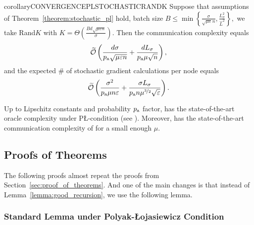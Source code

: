 \documentclass{article}
\newcommand{\alexander}[1]{\todo[inline]{\textbf{Alexander: }#1}}
\newcommand{\algorithmname}{DARIA}
\newcommand*{\probavailable}{\ensuremath{p_{\textnormal{a}}}}
\begin{document}
\begin{restatable}{corollary}{CONVERGENCEPLSTOCHASTICRANDK}
  Suppose that assumptions of Theorem~\ref{theorem:stochastic_pl} hold, 
  batch size $B \leq \min\left\{\frac{\sigma}{\sqrt{\mu \varepsilon} n}, \frac{L_{\sigma}^2}{\widehat{L}^2}\right\},$ 
  we take Rand$K$ with $K = \Theta\left(\frac{B d \sqrt{\mu \varepsilon n}}{\sigma}\right).$ Then
  the communication complexity equals 
  \begin{align*}
    \widetilde{\cO}\left(\frac{d \sigma}{\probavailable \sqrt{\mu \varepsilon n}} + \frac{d L_{\sigma}}{\probavailable \mu \sqrt{n}}\right),
  \end{align*}
  and the expected \# of stochastic gradient calculations per node equals
  \begin{align*}
    \widetilde{\cO}\left(\frac{\sigma^2}{\probavailable \mu n \varepsilon} + \frac{\sigma L_{\sigma}}{\probavailable n \mu^{\nicefrac{3}{2}} \sqrt{\varepsilon}}\right).
  \end{align*}
\end{restatable}
Up to Lipschitz constants and probability $\probavailable$ factor, \algname{\algorithmname-MVR} has the state-of-the-art oracle complexity under P\L-condition (see \citep{PAGE}). Moreover, \algname{\algorithmname-MVR} has the state-of-the-art communication complexity of  for a small enough $\mu$.


\subsection{Proofs of Theorems}
The following proofs almost repeat the proofs from Section~\ref{sec:proof_of_theorems}. And one of the main changes is that instead of Lemma~\ref{lemma:good_recursion}, we use the following lemma.

\subsubsection{Standard Lemma under Polyak-\L ojasiewicz Condition}
\end{document}
